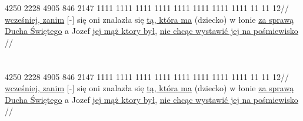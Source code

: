 \documentclass{article}
\newcommand\doubleline[1]{\underline{{\underline{#1}}}}
\newcommand{\vs}[1]{{\bfseries\versefont #1}}
\begin{document}
\exdisplay 
\begingl
\gla {} 4250 2228 4905 846 2147 1111 1111 1111 1111 1111 1111 1111 1111 {} 11 11 12//
\glb \vs{18} \underline{wcześniej, zanim} [-] się oni znalazła się \underline{tą, która ma} (dziecko) w łonie \underline{za sprawą} \doubleline{Ducha Świętego} \vs{19} a Jozef  \doubleline{jej mąż ktory był}, \doubleline{nie chcąc wystawić jej na pośmiewisko} //
\endgl
\section{}
\begingl
\gla {} 4250 2228 4905 846 2147 1111 1111 1111 1111 1111 1111 1111 1111 {} 11 11 12//
\glb \vs{18} \underline{wcześniej, zanim} [-] się oni znalazła się \underline{tą, która ma} (dziecko) w łonie \underline{za sprawą} \doubleline{Ducha Świętego} \vs{19} a Jozef  \doubleline{jej mąż ktory był}, \doubleline{nie chcąc wystawić jej na pośmiewisko} //
\endgl
\xe
\end{document}
